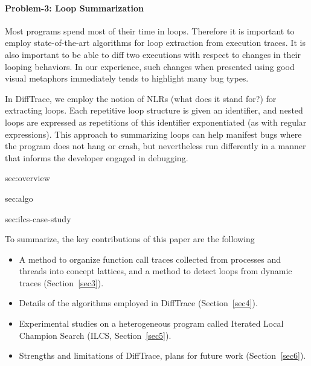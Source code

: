 \paragraph{Problem-3: Loop Summarization\/}
Most programs spend most of their time in loops.
%
Therefore it is important to employ state-of-the-art algorithms for
loop extraction from execution traces.
%
It is also important
to be able to diff two executions with respect to changes in their looping behaviors.
%
In our experience, such changes when presented using good visual metaphors
immediately tends to highlight many bug types.


In DiffTrace, we employ the notion of NLRs (what does it stand for?) for
extracting loops.
%
Each repetitive loop structure is given an identifier, and nested loops are
expressed as repetitions of this identifier exponentiated (as with regular
expressions).
%
This approach to summarizing loops can help manifest
bugs where the program does not hang or crash, but nevertheless
run differently in a manner that informs the developer engaged in debugging.

{sec:overview}

{sec:algo}

{sec:ilcs-case-study}

\noindent To summarize, the key contributions of this paper are the following
\begin{itemize}
\item A method to organize function call traces collected from processes and
      threads into concept lattices, and a method to
      detect loops from dynamic traces (Section~\ref{sec3}).

\item Details of the algorithms employed in DiffTrace (Section~\ref{sec4}).

\item Experimental studies on a heterogeneous program called
      Iterated Local Champion Search (ILCS, Section~\ref{sec5}).

\item Strengths and limitations of DiffTrace, plans for future work (Section~\ref{sec6}).
\end{itemize}




